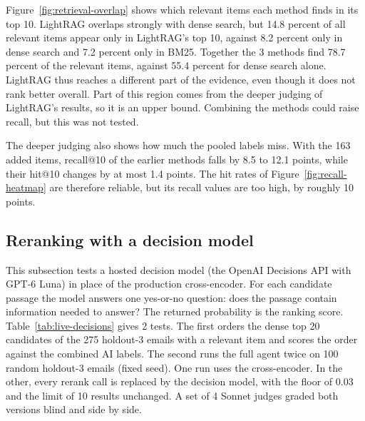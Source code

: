 

Figure~\ref{fig:retrieval-overlap} shows which relevant items each method finds in its top 10. LightRAG overlaps strongly with dense search, but 14.8 percent of all relevant items appear only in LightRAG's top 10, against 8.2 percent only in dense search and 7.2 percent only in BM25. Together the 3 methods find 78.7 percent of the relevant items, against 55.4 percent for dense search alone. LightRAG thus reaches a different part of the evidence, even though it does not rank better overall. Part of this region comes from the deeper judging of LightRAG's results, so it is an upper bound. Combining the methods could raise recall, but this was not tested.

The deeper judging also shows how much the pooled labels miss. With the 163 added items, recall@10 of the earlier methods falls by 8.5 to 12.1 points, while their hit@10 changes by at most 1.4 points. The hit rates of Figure~\ref{fig:recall-heatmap} are therefore reliable, but its recall values are too high, by roughly 10 points.

\subsection{Reranking with a decision model}
\label{sec:live-decisions}

This subsection tests a hosted decision model (the OpenAI Decisions API with GPT-6 Luna) in place of the production cross-encoder. For each candidate passage the model answers one yes-or-no question: does the passage contain information needed to answer? The returned probability is the ranking score. Table~\ref{tab:live-decisions} gives 2 tests. The first orders the dense top 20 candidates of the 275 holdout-3 emails with a relevant item and scores the order against the combined AI labels. The second runs the full agent twice on 100 random holdout-3 emails (fixed seed). One run uses the cross-encoder. In the other, every rerank call is replaced by the decision model, with the floor of 0.03 and the limit of 10 results unchanged. A set of 4 Sonnet judges graded both versions blind and side by side.

